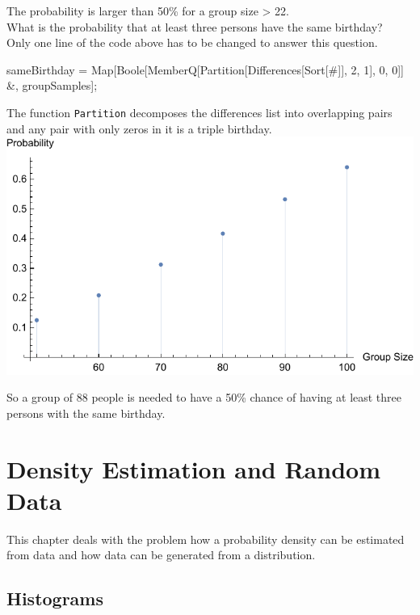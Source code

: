 \documentclass{tstextbook}
\begin{document}
\begin{example}
 The probability is larger than 50\%  for a group size > 22.\\

What is the probability that at least three persons have the same birthday?\\

Only one line of the code above has to be changed to answer this question. 
\begin{mathematica}
sameBirthday = 
    Map[Boole[MemberQ[Partition[Differences[Sort[#]], 2, 1], {0, 0}]] &,
    groupSamples];
\end{mathematica}

The function \texttt{Partition} decomposes the differences list into overlapping pairs and any pair with only zeros in it is a triple birthday.\\   

\includegraphics[scale=1, center]{images/triple_birthday_problem.pdf}

So a group of 88 people is needed to have a 50\% chance of having at least three persons with the same birthday.
\end{example}

\chapter{Density Estimation and Random Data}

\begin{summary}
  This chapter deals with the problem how a probability density can be estimated from data and how data can be generated from a distribution.
\end{summary}

\section{Histograms}
\label{Histograms}
\end{document}
